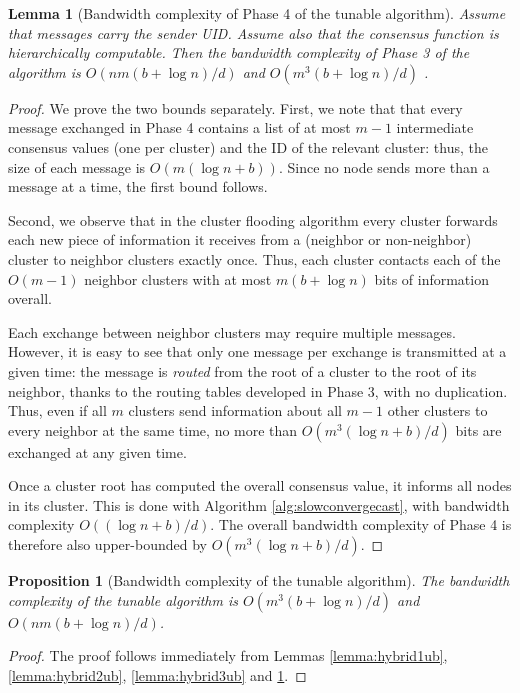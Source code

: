 \documentclass[letterpaper,10pt,conference]{ieeeconf}
\newtheorem{proposition}[theorem]{Proposition}
\newtheorem{lemma}[theorem]{Lemma}
\begin{document}
\begin{lemma}[Bandwidth complexity of Phase 4 of the tunable algorithm]
\label{lemma:hybrid4ub}
Assume that messages carry the sender UID. Assume also that the consensus function is hierarchically computable. Then the bandwidth complexity of Phase 3 of the algorithm is $O(nm(b+\log n)/d)$ and $O(m^3(b+\log n)/d)$ .
\end{lemma}
\begin{proof}
We prove the two bounds separately. First, we note that that every message exchanged in Phase 4 contains a list of at most $m-1$ intermediate consensus values (one per cluster) and the ID of the relevant cluster: thus, the size of each message is $O(m(\log n + b))$. Since no node sends more than a message at a time, the first bound follows.

Second, we observe that in the cluster flooding algorithm every cluster forwards each new piece of information it receives from a (neighbor or non-neighbor) cluster to neighbor clusters exactly once. Thus, each cluster contacts each of the $O(m-1)$ neighbor clusters with at most $m(b+\log n)$ bits of information overall.

Each exchange between neighbor clusters may require multiple messages. However, it is easy to see that only one message per exchange is transmitted at a given time: the message is \emph{routed} from the root of a cluster to the root of its neighbor, thanks to the routing tables developed in Phase 3, with no duplication. Thus, even if all $m$ clusters send information about all $m-1$ other clusters to every neighbor at the same time, no more than $O(m^3(\log n + b)/d)$ bits are exchanged at any given time.

Once a cluster root has computed the overall consensus value, it informs all nodes in its cluster. This is done with Algorithm \ref{alg:slowconvergecast}, with bandwidth complexity $O((\log n + b)/d)$. The overall bandwidth complexity of Phase 4 is therefore also upper-bounded by $O(m^3(\log n + b)/d)$.
\end{proof}



\begin{proposition}[Bandwidth complexity of the tunable algorithm]
The bandwidth complexity of the tunable algorithm is $O(m^3(b+\log n)/d)$ and $O(nm(b+\log n)/d)$.
\end{proposition}
\begin{proof}
The proof follows immediately from Lemmas \ref{lemma:hybrid1ub}, \ref{lemma:hybrid2ub}, \ref{lemma:hybrid3ub} and \ref{lemma:hybrid4ub}.
\end{proof}
\end{document}
